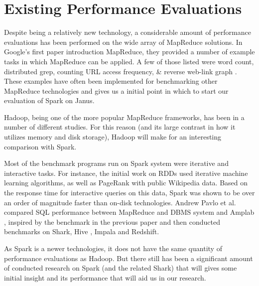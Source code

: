 \documentclass{article}
\begin{document}

\section*{Existing Performance Evaluations }
Despite being a relatively new technology, a considerable amount of performance
evaluations has been performed on the wide array of MapReduce solutions.
In Google's first paper introduction MapReduce, they provided a number of
example tasks in which MapReduce can be applied. A few of those listed were
word count, distributed grep, counting URL access frequency, \& reverse web-link
graph \citep{dean-mapreduce}. These examples have often been implemented for
benchmarking other MapReduce technologies and gives us a initial point in which
to start our evaluation of Spark on Janus.

Hadoop, being one of the more popular MapReduce frameworks, has been in a
number of different studies. For this reason (and its large contrast in how
it utilizes memory and disk storage), Hadoop will make for an interesting
comparison with Spark.

Most of the benchmark programs run on Spark system were iterative and
interactive tasks. For instance, the initial work on RDDs \citep{zaharia_rdd}
used iterative machine learning algorithms, as well as PageRank with public
Wikipedia data. Based on the response time for interactive queries on
this data, Spark was shown to be over an order of magnitude faster than
on-disk technologies.
Andrew Pavlo et al. \cite{andrew} compared SQL performance between
MapReduce and DBMS system and Amplab \citep{amplab_bench}, inspired by the
benchmark in the previous paper and then conducted benchmarks on Shark,
Hive \citep{ashish}, Impala and Redshift.


As Spark is a newer technologies, it does not have the same quantity of
performance evaluations as Hadoop. But there still has been a significant
amount of conducted research on Spark (and the related Shark) that will gives
some initial insight and its performance that will aid us in our research.

\end{document}
